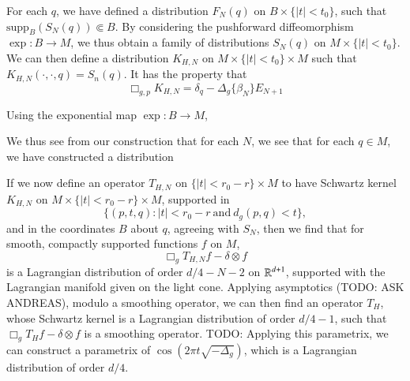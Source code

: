 For each $q$, we have defined a distribution $F_N(q)$ on $B \times \{ |t| < t_0 \}$, such that $\text{supp}_B(S_N(q)) \Subset B$. By considering the pushforward diffeomorphism $\exp: B \to M$, we thus obtain a family of distributions $S_N(q)$ on $M \times \{ |t| < t_0 \}$. We can then define a distribution $K_{H,N}$ on $M \times \{ |t| < t_0 \} \times M$ such that $K_{H,N}(\cdot, \cdot, q) = S_n(q)$. It has the property that 
%
\[ \Box_{g,p} K_{H,N} = \delta_q - \Delta_g \{ \beta_N \} E_{N+1} \] 

Using the exponential map $\exp: B \to M$, 

We thus see from our construction that for each $N$, we see that for each $q \in M$, we have constructed a distribution 

If we now define an operator $T_{H,N}$ on $\{ |t| < r_0 - r \} \times M$ to have Schwartz kernel $K_{H,N}$ on $M \times \{ |t| < r_0 - r \} \times M$, supported in
%
\[ \{ (p,t,q) : |t| < r_0 - r\ \text{and}\ d_g(p,q) < t \}, \]
%
and in the coordinates $B$ about $q$, agreeing with $S_N$, then we find that for smooth, compactly supported functions $f$ on $M$,
%
\[ \Box_g T_{H,N} f - \delta \otimes f \]
%
is a Lagrangian distribution of order $d/4 - N - 2$ on $\operatorname{\mathbb{R}}^{d+1}$, supported with the Lagrangian manifold given on the light cone. Applying asymptotics (TODO: ASK ANDREAS), modulo a smoothing operator, we can then find an operator $T_H$, whose Schwartz kernel is a Lagrangian distribution of order $d/4 - 1$, such that $\Box_g T_H f - \delta \otimes f$ is a smoothing operator. TODO: Applying this parametrix, we can construct a parametrix of $\cos(2 \pi t \sqrt{-\Delta_g})$, which is a Lagrangian distribution of order $d/4$.

